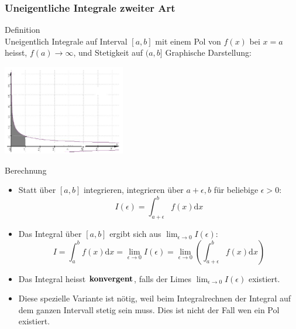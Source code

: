 \subsubsection{Uneigentliche Integrale zweiter Art}
	\begin{definition}{Definition}\\
		Uneigentlich Integrale auf Interval \([a,b]\) mit einem Pol von \(f(x)\) bei \(x=a\) heisst,
		\(f(a) \rightarrow \infty\), und Stetigkeit auf \((a,b]\)
		Graphische Darstellung:
	\begin{center}
		\includegraphics[width=0.4\textwidth]{images/Uneigentlicher_Integral_Beispiel2.png}
	\end{center}
  \end{definition}
  \begin{KR}{Berechnung}
	  \begin{itemize}
	  	
\item Statt über \([a,b]\) integrieren, integrieren über \(a+\epsilon,b\) für beliebige \(\epsilon>0\):
	\[I(\epsilon)=\int_{a+\epsilon}^b{f(x)\mathrm{d}x}\]
\item Das Integral über \([a,b]\) ergibt sich aus \(\lim_{\epsilon \rightarrow 0}I(\epsilon)\):
	\[I=\int_a^b{f(x)\mathrm{d}x}=\underset{\epsilon \rightarrow 0}{\lim}I(\epsilon)=\underset{\epsilon \rightarrow
	0}{\lim}\left(\int_{a+\epsilon}^b{f(x)\mathrm{d}x}\right) \]
\item Das Integral heisst \(\bold{konvergent}\), falls der Limes \(\lim_{\epsilon \rightarrow 0}I(\epsilon)\) existiert.
\item Diese spezielle Variante ist nötig, weil beim Integralrechnen der Integral auf dem ganzen Intervall stetig sein
	muss. Dies ist nicht der Fall wen ein Pol existiert.
\end{itemize}
  \end{KR}
